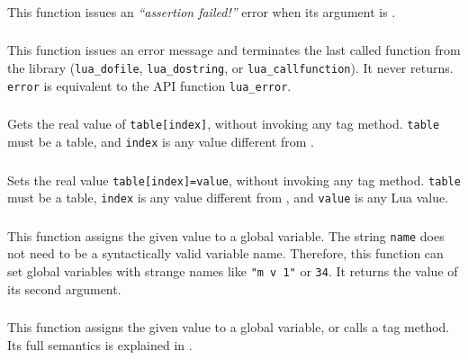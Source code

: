 \subsubsection*{\ff {}}
This function issues an \emph{``assertion failed!''} error
when its argument is \nil.

\subsubsection*{\ff {}}\label{pdf-error}
This function issues an error message and terminates
the last called function from the library
(\verb|lua_dofile|, \verb|lua_dostring|, or \verb|lua_callfunction|).
It never returns.
\verb|error| is equivalent to the API function \verb|lua_error|.

\subsubsection*{\ff {}}
Gets the real value of \verb|table[index]|,
without invoking any tag method.
\verb|table| must be a table,
and \verb|index| is any value different from \nil.

\subsubsection*{\ff {}}
Sets the real value \verb|table[index]=value|,
without invoking any tag method.
\verb|table| must be a table,
\verb|index| is any value different from \nil,
and \verb|value| is any Lua value.

\subsubsection*{\ff {}}
This function assigns the given value to a global variable.
The string \verb|name| does not need to be a syntactically valid variable name.
Therefore, this function can set global variables with strange names like
\verb|"m v 1"| or \verb|34|.
It returns the value of its second argument.

\subsubsection*{\ff {}}
This function assigns the given value to a global variable,
or calls a tag method.
Its full semantics is explained in .

